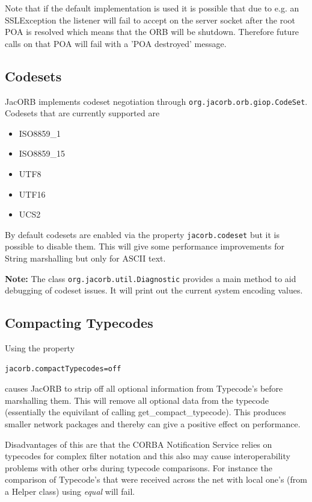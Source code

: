 Note that if the default implementation is used it is possible that due to e.g.
an SSLException the listener will fail to accept on the server socket after the
root POA is resolved which means that the ORB will be shutdown. Therefore future
calls on that POA will fail with a 'POA destroyed' message.

\subsection{Codesets}
\label{jacorb-codeset}
JacORB implements codeset negotiation through {\tt org.jacorb.orb.giop.CodeSet}. Codesets
that are currently supported are
\begin{itemize}
\item ISO8859\_1
\item ISO8859\_15
\item UTF8
\item UTF16
\item UCS2
\end{itemize}

By default codesets are enabled via the property {\tt jacorb.codeset} but it is possible to disable
them. This will give some performance improvements for String marshalling but only for ASCII text.

\textbf{Note:} The class {\tt org.jacorb.util.Diagnostic} provides a main method to
aid debugging of codeset issues. It will print out the current system encoding values.

\subsection{Compacting Typecodes}
\label{compact-typecode}
Using the property
\begin{verbatim}
jacorb.compactTypecodes=off
\end{verbatim}
causes JacORB to strip off all optional information from Typecode's before marshalling them.
This will remove all optional data from the typecode (essentially the equivilant of
calling get\_compact\_typecode). This produces smaller network packages and thereby can give a positive effect on performance.

Disadvantages of this are that the CORBA Notification Service relies on typecodes for complex
filter notation and this also may cause interoperability problems with other orbs during typecode
comparisons. For instance the comparison of Typecode's that were received across the net with
local one's (from a Helper class) using \emph{equal} will fail.

